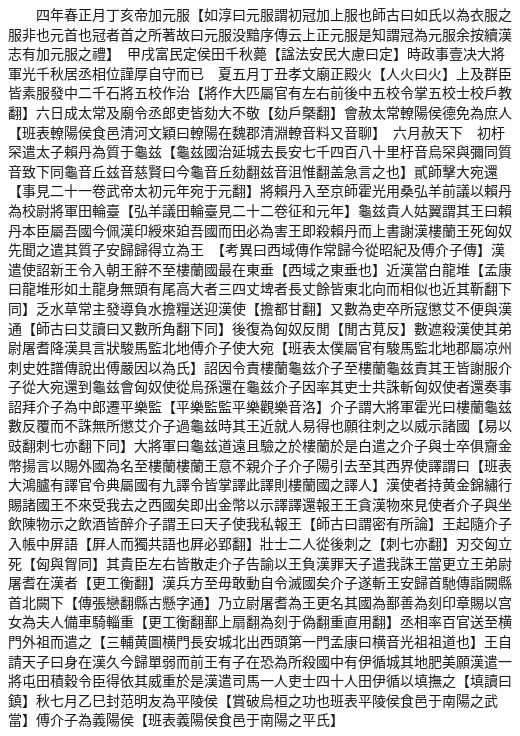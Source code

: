 　　四年春正月丁亥帝加元服【如淳曰元服謂初冠加上服也師古曰如氏以為衣服之服非也元首也冠者首之所著故曰元服没黯序傳云上正元服是知謂冠為元服余按續漢志有加元服之禮】　甲戌富民定侯田千秋薨【諡法安民大慮曰定】時政事壹决大將軍光千秋居丞相位謹厚自守而已　夏五月丁丑孝文廟正殿火【人火曰火】上及群臣皆素服發中二千石將五校作治【將作大匹屬官有左右前後中五校令掌五校士校戶教翻】六日成太常及廟令丞郎吏皆劾大不敬【劾戶槩翻】會赦太常轑陽侯德免為庶人【班表轑陽侯食邑清河文穎曰轑陽在魏郡清淵轑音料又音聊】　六月赦天下　初杅罙遣太子賴丹為質于龜兹【龜兹國治延城去長安七千四百八十里杅音烏罙與彌同質音致下同龜音丘兹音慈賢曰今龜音丘劾翻兹音沮惟翻盖急言之也】貳師擊大宛還【事見二十一卷武帝太初元年宛于元翻】將賴丹入至京師霍光用桑弘羊前議以賴丹為校尉將軍田輪臺【弘羊議田輪臺見二十二卷征和元年】龜兹貴人姑翼謂其王曰賴丹本臣屬吾國今佩漢印綬來廹吾國而田必為害王即殺賴丹而上書謝漢樓蘭王死匈奴先聞之遣其質子安歸歸得立為王　【考異曰西域傳作常歸今從昭紀及傅介子傳】漢遣使詔新王令入朝王辭不至樓蘭國最在東垂【西域之東垂也】近漢當白龍堆【孟康曰龍堆形如土龍身無頭有尾高大者三四丈埤者長丈餘皆東北向而相似也近其靳翻下同】乏水草常主發導負水擔糧送迎漢使【擔都甘翻】又數為吏卒所寇懲艾不便與漢通【師古曰艾讀曰又數所角翻下同】後復為匈奴反閒【閒古莧反】數遮殺漢使其弟尉屠耆降漢具言狀駿馬監北地傅介子使大宛【班表太僕屬官有駿馬監北地郡屬凉州刺史姓譜傳說出傅嚴因以為氏】詔因令責樓蘭龜兹介子至樓蘭龜兹責其王皆謝服介子從大宛還到龜兹會匈奴使從烏孫還在龜兹介子因率其吏士共誅斬匈奴使者還奏事詔拜介子為中郎遷平樂監【平樂監監平樂觀樂音洛】介子謂大將軍霍光曰樓蘭龜兹數反覆而不誅無所懲艾介子過龜兹時其王近就人易得也願往刺之以威示諸國【易以豉翻刺七亦翻下同】大將軍曰龜兹道遠且驗之於樓蘭於是白遣之介子與士卒俱齎金幣揚言以賜外國為名至樓蘭樓蘭王意不親介子介子陽引去至其西界使譯謂曰【班表大鴻臚有譯官令典屬國有九譯令皆掌譯此譯則樓蘭國之譯人】漢使者持黄金錦繡行賜諸國王不來受我去之西國矣即出金幣以示譯譯還報王王貪漢物來見使者介子與坐飲陳物示之飲酒皆醉介子謂王曰天子使我私報王【師古曰謂密有所論】王起隨介子入帳中屏語【屛人而獨共語也屛必郢翻】壯士二人從後刺之【刺七亦翻】刃交匈立死【匈與胷同】其貴臣左右皆散走介子告諭以王負漢罪天子遣我誅王當更立王弟尉屠耆在漢者【更工衡翻】漢兵方至毋敢動自令滅國矣介子遂斬王安歸首馳傳詣闕縣首北闕下【傳張戀翻縣古懸字通】乃立尉屠耆為王更名其國為鄯善為刻印章賜以宫女為夫人備車騎輜重【更工衡翻鄯上扇翻為刻于偽翻重直用翻】丞相率百官送至横門外祖而遣之【三輔黄圖横門長安城北出西頭第一門孟康曰横音光祖祖道也】王自請天子曰身在漢久今歸單弱而前王有子在恐為所殺國中有伊循城其地肥美願漢遣一將屯田積穀令臣得依其威重於是漢遣司馬一人吏士四十人田伊循以填撫之【填讀曰鎮】秋七月乙巳封范明友為平陵侯【賞破烏桓之功也班表平陵侯食邑于南陽之武當】傅介子為義陽侯【班表義陽侯食邑于南陽之平氏】


